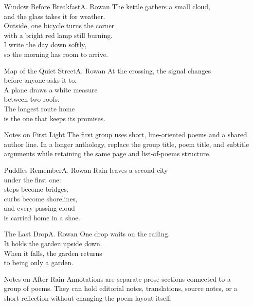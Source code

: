 \documentclass[11pt,oneside]{book}
\begin{document}
\maketitle
\makededication[center]
\maketoc
\maketop


\begin{poem}{Window Before Breakfast}{A. Rowan}
The kettle gathers a small cloud,\\
and the glass takes it for weather.\\
Outside, one bicycle turns the corner\\
with a bright red lamp still burning.\\
I write the day down softly,\\
so the morning has room to arrive.
\end{poem}

\begin{poem}{Map of the Quiet Street}{A. Rowan}
At the crossing, the signal changes\\
before anyone asks it to.\\
A plane draws a white measure\\
between two roofs.\\
The longest route home\\
is the one that keeps its promises.
\end{poem}

\begin{annotation}{Notes on First Light}
The first group uses short, line-oriented poems and a shared author line. In a longer anthology, replace the group title, poem title, and subtitle arguments while retaining the same page and list-of-poems structure.
\end{annotation}


\begin{poem}{Puddles Remember}{A. Rowan}
Rain leaves a second city\\
under the first one: \\
steps become bridges,\\
curbs become shorelines,\\
and every passing cloud\\
is carried home in a shoe.
\end{poem}

\begin{poem}[center]{The Last Drop}{A. Rowan}
One drop waits on the railing.\\
It holds the garden upside down.\\
When it falls, the garden returns\\
to being only a garden.
\end{poem}

\begin{annotation}{Notes on After Rain}
Annotations are separate prose sections connected to a group of poems. They can hold editorial notes, translations, source notes, or a short reflection without changing the poem layout itself.
\end{annotation}
\end{document}
